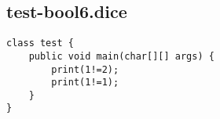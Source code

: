 \subsection{test-bool6.dice}
\begin{verbatim}
class test {
	public void main(char[][] args) {
		print(1!=2);
		print(1!=1);
	}
}
\end{verbatim}